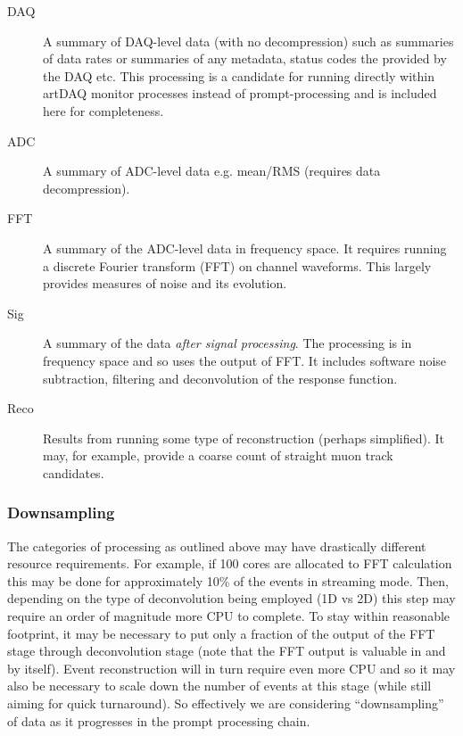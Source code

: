 \documentclass[pdftex,12pt,letter]{article}
\begin{document}
\begin{description}

\item[DAQ] A summary of DAQ-level data (with no decompression) such as summaries of data
 rates  or summaries of any metadata, status codes the provided by the DAQ etc.
This processing is a candidate for running directly within artDAQ
monitor processes instead of prompt-processing and is included here
for completeness.

\item[ADC] A summary of ADC-level data e.g. mean/RMS (requires data decompression).


\item[FFT] A summary of the ADC-level data in frequency space. It requires running a discrete Fourier
transform (FFT) on channel waveforms. This largely  provides measures of noise and its
evolution.

\item[Sig] A summary of the data \textit{after signal processing}.
The processing is in  frequency space and so uses the output of FFT.  It includes software
noise subtraction, filtering and deconvolution of the response function.

\item[Reco] Results from running some type of reconstruction (perhaps simplified).
It may, for  example, provide a coarse count of straight muon track candidates.

\end{description}


\subsubsection{Downsampling}
\label{sec:downsampling}
The categories of processing as outlined above may have drastically different resource requirements.
For example, if 100 cores are allocated to FFT calculation this may be done for approximately 10\% of the events
in streaming mode. Then, depending on the type of deconvolution being employed (1D vs 2D) this step
may require an order of magnitude more CPU to complete. To stay within reasonable footprint,
it may be necessary to put only a fraction of the output of the FFT stage through deconvolution stage
(note that the FFT output is valuable in and by itself). Event reconstruction will in turn require even more CPU
and so it may also be necessary to scale down the number of
events at this stage (while still aiming for quick turnaround). So effectively we are considering ``downsampling''
of data as it progresses in the prompt processing chain.
\end{document}

